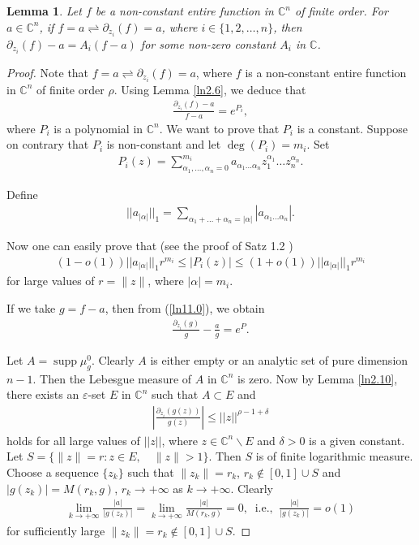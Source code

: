 \documentclass[11pt, reqno]{amsart}
\newtheorem*{cor A}{Corollary A}
\newtheorem*{cor B}{Corollary B}
\newtheorem{lem}{Lemma}[section]
\numberwithin{equation}{section}
\begin{document}
\begin{lem}\label{ln2.11} Let $f$ be a non-constant entire function in $\mathbb{C}^n$ of finite order. For $a\in\mathbb{C}^n$, if $f=a\rightleftharpoons \partial_{z_i}(f)=a$, where $i\in\{1,2,\ldots,n\}$, then $\partial_{z_i}(f)-a=A_i(f-a)$ for some non-zero constant $A_i$ in $\mathbb{C}$.
\end{lem}
\begin{proof} Note that $f=a\rightleftharpoons \partial_{z_i}(f)=a$, where $f$ is a non-constant entire function in $\mathbb{C}^n$ of finite order $\rho$. Using Lemma \ref{ln2.6}, we deduce that
\begin{align}\label{ln11.0}
\frac{\partial_{z_i}(f)-a}{f-a}=e^{P_i},
\end{align}
where $P_i$ is a polynomial in $\mathbb{C}^n$. We want to prove that $P_i$ is a constant. Suppose on contrary that $P_i$ is non-constant and let $\deg(P_i)=m_i$. Set
\begin{align*}
P_i(z)=\sum\limits_{\alpha_1,\ldots,\alpha_n=0}^{m_i}a_{\alpha_1\ldots\alpha_n}z_1^{\alpha_1}\ldots z_n^{\alpha_n}.
\end{align*}

Define
\begin{align*}
||a_{|\alpha|}||_{1}=\sum\limits_{\alpha_1+\ldots+\alpha_n=|\alpha|} |a_{\alpha_1\ldots\alpha_n}|.
\end{align*}

Now one can easily prove that (see the proof of Satz 1.2 \cite{Jank-Volkmann-1985})
\begin{align}\label{ln11.0a}
(1-o(1))||a_{|\alpha|}||_1r^{m_i}\leq |P_i(z)|\leq (1+o(1))||a_{|\alpha|}||_1r^{m_i}
\end{align}
for large values of $r=\|z\|$, where $|\alpha|=m_i$.

If we take $g=f-a$, then from (\ref{ln11.0}), we obtain
\begin{align}\label{ln11.3}
\frac{\partial_{z_i}(g)}{g}-\frac{a}{g}=e^P.
\end{align}

Let $A=\operatorname{supp}\mu^0_g$. Clearly $A$ is either empty or an analytic set of pure dimension $n-1$. Then the Lebesgue measure of $A$ in $\mathbb{C}^n$ is zero. Now by Lemma \ref{ln2.10}, there exists an $\varepsilon$-set $E$ in $\mathbb{C}^n$ such that $A\subset E$ and
\begin{align}\label{ln11.1} 
\left|\frac{\partial_{z_i}(g(z))}{g(z)}\right|\leq ||z||^{\rho-1+\delta}
\end{align}
holds for all large values of $||z||$, where $z\in \mathbb{C}^n\backslash E$ and $\delta>0$ is a given constant.
Let $S=\{\|z\|=r: z\in E,\quad \|z\|>1\}$. Then $S$ is of finite logarithmic measure. Choose a sequence $\{z_k\}$ such that $\|z_k\|=r_k$, $r_k\not\in [0,1]\cup S$ and $|g(z_k)|=M(r_k,g)$, $r_k\to +\infty$ as $k\to +\infty$. Clearly
\begin{align}\label{ln11.2} 
\lim\limits_{k\rightarrow +\infty}\frac{|a|}{|g(z_k)|}=\lim\limits_{k\rightarrow +\infty}\frac{|a|}{M(r_k,g)}=0,\;\;\text{i.e.,}\;\;\frac{|a|}{|g(z_k)|}=o(1)
\end{align}
for sufficiently large $\|z_k\|=r_k\not\in [0,1]\cup S$. 


\end{proof}
\end{document}
